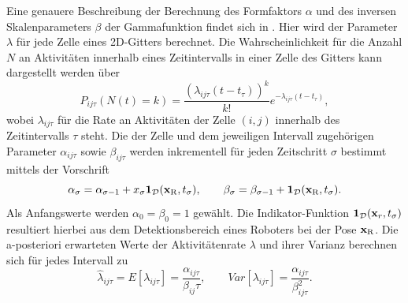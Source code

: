 Eine genauere Beschreibung der Berechnung des Formfaktors $\alpha$ und des inversen Skalenparameters $\beta$ der Gammafunktion findet sich in \cite{Stuede.2020}. Hier wird der Parameter $\lambda$ für jede Zelle eines 2D-Gitters berechnet. Die Wahrscheinlichkeit
für die Anzahl $N$ an Aktivitäten innerhalb eines Zeitintervalls in einer Zelle des Gitters kann dargestellt werden über
\begin{equation}
	P_{ij \tau} (N(t) = k) = \frac{(\lambda_{ij \tau}(t-t_\tau))^k}{k!} e^{-\lambda_{ij\tau} (t- t_\tau)} ,
\end{equation}
wobei $\lambda_{ij \tau}$ für die Rate an Aktivitäten der Zelle $(i,j)$ innerhalb des Zeitintervalls $\tau$ steht. Die der Zelle und dem jeweiligen Intervall zugehörigen Parameter $\alpha_{ij\tau}$ sowie $\beta_{ij\tau}$ werden inkrementell für jeden Zeitschritt $\sigma$ bestimmt  mittels der Vorschrift
\begin{equation}
	\alpha_\sigma = \alpha_{\sigma - 1} + x_\sigma \mathbf{1}_{\mathrm{\mathcal{D}}} (\mathbf{x}_{\mathrm{R}}, t_\sigma),\qquad  \beta_\sigma = \beta_{\sigma - 1} + \mathbf{1}_{\mathrm{\mathcal{D}}} (\mathbf{x}_{\mathrm{R}}, t_\sigma ) .
\end{equation}
Als Anfangswerte werden $\alpha_0 = \beta_0 = 1 $ gewählt. Die Indikator-Funktion $\mathbf{1}_{\mathrm{\mathcal{D}}} (\mathbf{x}_r, t_\sigma)$ resultiert hierbei aus dem Detektionsbereich eines Roboters bei der Pose $\mathbf{x}_{\mathrm{R}}$. Die a-posteriori erwarteten Werte der Aktivitätenrate $\lambda$ und ihrer Varianz berechnen sich für jedes Intervall zu
\begin{equation}
	\hat{\lambda}_{ij\tau} = E[\lambda_{ij\tau}] = \frac{\alpha_{ij\tau}}{\beta_{ij}\tau},\qquad	Var[\lambda_{ij\tau}] = \frac{\alpha_{ij\tau}}{\beta_{ij\tau}^2} .
\end{equation}


